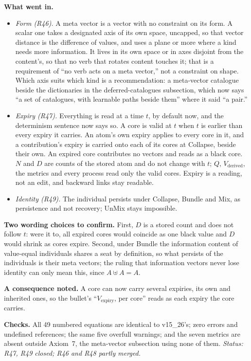 \documentclass[11pt]{article}
\begin{document}
\textbf{What went in.}
\begin{itemize}
\item \emph{Form (R46).} A meta vector is a vector with no constraint on
its form. A scalar one takes a designated axis of its own space, uncapped,
so that vector distance is the difference of values, and uses a plane or
more where a kind needs more information. It lives in its own space or in
axes disjoint from the content's, so that no verb that rotates content
touches it; that is a requirement of ``no verb acts on a meta vector,''
not a constraint on shape. Which axis suits which kind is a
recommendation: a meta-vector catalogue beside the dictionaries in the
deferred-catalogues subsection, which now says ``a set of catalogues, with
learnable paths beside them'' where it said ``a pair.''
\item \emph{Expiry (R47).} Everything is read at a time $t$, by default
now, and the determinism sentence now says so. A core is valid at $t$ when
$t$ is earlier than every expiry it carries. An atom's own expiry applies
to every core in it, and a contribution's expiry is carried onto each of
its cores at Collapse, beside their own. An expired core contributes no
vectors and reads as a black core. $N$ and $D$ are counts of the stored
atom and do not change with $t$; $Q$, $V_{\text{derived}}$, the metrics and
every process read only the valid cores. Expiry is a reading, not an edit,
and backward links stay readable.
\item \emph{Identity (R49).} The individual persists under Collapse,
Bundle and Mix, as persistence and not recovery; UnMix stays impossible.
\end{itemize}

\textbf{Two wording choices to confirm.} First, $D$ is a stored count and
does not follow $t$: were it to, all expired cores would coincide as one
black value and $D$ would shrink as cores expire. Second, under Bundle the
information content of value-equal individuals shares a seat by
definition, so what persists of the individuals is their meta vectors;
the ruling that information vectors never lose identity can only mean
this, since $A\uplus A=A$.

\textbf{A consequence noted.} A core can now carry several expiries, its
own and inherited ones, so the bullet's ``$V_{\text{expiry}}$, per core''
reads as each expiry the core carries.

\textbf{Checks.} All 49 numbered equations are identical to v15\_26's;
zero errors and undefined references; the same five overfull warnings; and
the seven metrics are absent outside Axiom~7, the meta-vector subsection
using none of them.
\emph{Status: R47, R49 closed; R46 and R48 partly merged.}
\end{document}
